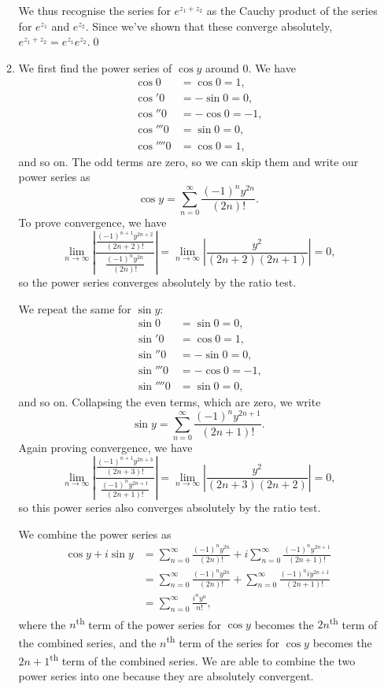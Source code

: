 \documentclass[oneside]{article}
\newcommand\abs[1]{\left|#1\right|}
\begin{document}
\begin{enumerate}[label=\textbf{\arabic*.}]
\begin{enumerate}[label=\textbf{(\alph*)}]
    We thus recognise the series for $e^{z_1 + z_2}$ as the Cauchy product of
    the series for $e^{z_1}$ and $e^{z_2}$. Since we've shown that these
    converge absolutely, $e^{z_1 + z_2} = e^{z_1}e^{z_2}$.\qed

    \item We first find the power series of $\cos y$ around $0$. We have
    \begin{align*}
      \cos0 &= \cos 0 = 1\text{,} \\
      \cos'0 &= -\sin 0 = 0\text{,} \\
      \cos''0 &= -\cos 0 = -1\text{,} \\
      \cos'''0 &= \sin 0 = 0\text{,} \\
      \cos''''0 &= \cos 0 = 1\text{,}
    \end{align*} and so on. The odd terms are zero, so we can skip them and
    write our power series as \[
      \cos y = \sum_{n=0}^\infty \frac{(-1)^ny^{2n}}{(2n)!} \text{.}
    \] To prove convergence, we have\[
      \lim_{n\to\infty}\abs{\frac{\frac{(-1)^{n+1}y^{2n+2}}{(2n+2)!}}
      {\frac{(-1)^ny^{2n}}{(2n)!}}}
      = \lim_{n\to\infty}\abs{\frac{y^2}{(2n+2)(2n+1)}} = 0 \text{,}
    \] so the power series converges absolutely by the ratio test.

    We repeat the same for $\sin y$: \begin{align*}
      \sin0 &= \sin 0 = 0\text{,} \\
      \sin'0 &= \cos 0 = 1\text{,} \\
      \sin''0 &= -\sin 0 = 0\text{,} \\
      \sin'''0 &= -\cos 0 = -1\text{,} \\
      \sin''''0 &= \sin 0 = 0\text{,}
    \end{align*} and so on. Collapsing the even terms, which are zero, we write \[
      \sin y = \sum_{n=0}^\infty \frac{(-1)^ny^{2n+1}}{(2n+1)!} \text{.}
    \] Again proving convergence, we have\[
      \lim_{n\to\infty}\abs{\frac{\frac{(-1)^{n+1}y^{2n+3}}{(2n+3)!}}
      {\frac{(-1)^ny^{2n+1}}{(2n+1)!}}}
      = \lim_{n\to\infty}\abs{\frac{y^2}{(2n+3)(2n+2)}}
      = 0\text{,}
    \] so this power series also converges absolutely by the ratio test.

    We combine the power series as \begin{align*}
      \cos y + i\sin y &= \sum_{n=0}^\infty \frac{(-1)^ny^{2n}}{(2n)!}
        + i \sum_{n=0}^\infty \frac{(-1)^ny^{2n+1}}{(2n+1)!} \\
      &= \sum_{n=0}^\infty \frac{(-1)^ny^{2n}}{(2n)!}
        + \sum_{n=0}^\infty \frac{(-1)^niy^{2n+1}}{(2n+1)!} \\
      &= \sum_{n=0}^\infty \frac{i^ny^n}{n!} \text{,}
    \end{align*} where the $n$\textsuperscript{th} term of the power series for
    $\cos y$ becomes the $2n$\textsuperscript{th} term of the combined series,
    and the $n$\textsuperscript{th} term of the series for $\cos y$ becomes the
    $2n + 1$\textsuperscript{th} term of the combined series. We are able to
    combine the two power series into one because they are absolutely
    convergent.


\end{enumerate}
\end{enumerate}
\end{document}
